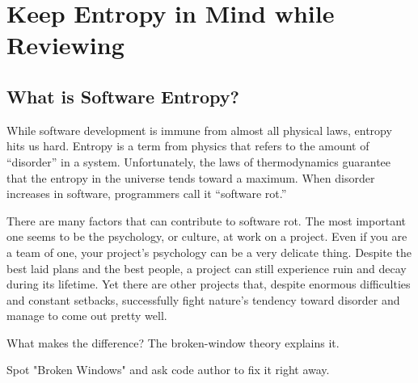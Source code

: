 
\chapter{Keep Entropy in Mind while Reviewing}

\section{What is Software Entropy?}

While software development is immune from almost all physical laws, entropy hits us hard. Entropy is a term from physics that refers to the amount of “disorder” in a system. Unfortunately, the laws of thermodynamics guarantee that the entropy in the universe tends toward a maximum. When disorder increases in software, programmers call it “software rot.”

There are many factors that can contribute to software rot. The most important one seems to be the psychology, or culture, at work on a project. Even if you are a team of one, your project's psychology can be a very delicate thing. Despite the best laid plans and the best people, a project can still experience ruin and decay during its lifetime. Yet there are other projects that, despite enormous difficulties and constant setbacks, successfully fight nature's tendency toward disorder and manage to come out pretty well.

What makes the difference? The broken-window theory explains it.

\begin{marker}
Spot "Broken Windows" and ask code author to fix it right away.
\end{marker}
